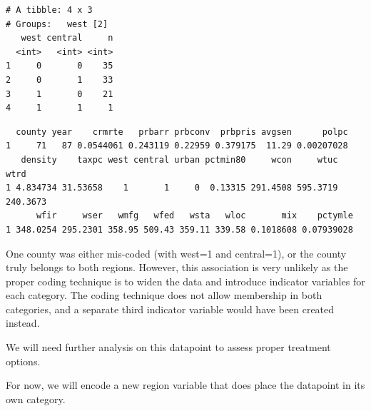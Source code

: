 \documentclass[]{article}
\newenvironment{Shaded}{}{}
\newcommand{\DecValTok}[1]{#1}
\newcommand{\KeywordTok}[1]{\textcolor[rgb]{0.00,0.00,1.00}{#1}}
\newcommand{\NormalTok}[1]{#1}
\newcommand{\OperatorTok}[1]{#1}
\newcommand{\StringTok}[1]{\textcolor[rgb]{0.00,0.50,0.50}{#1}}
\begin{document}
\begin{verbatim}
# A tibble: 4 x 3
# Groups:   west [2]
   west central     n
  <int>   <int> <int>
1     0       0    35
2     0       1    33
3     1       0    21
4     1       1     1
\end{verbatim}

\begin{Shaded}
\end{Shaded}

\begin{verbatim}
  county year    crmrte   prbarr prbconv  prbpris avgsen      polpc
1     71   87 0.0544061 0.243119 0.22959 0.379175  11.29 0.00207028
   density    taxpc west central urban pctmin80     wcon     wtuc     wtrd
1 4.834734 31.53658    1       1     0  0.13315 291.4508 595.3719 240.3673
      wfir     wser   wmfg   wfed   wsta   wloc       mix    pctymle
1 348.0254 295.2301 358.95 509.43 359.11 339.58 0.1018608 0.07939028
\end{verbatim}

One county was either mis-coded (with west=1 and central=1), or the
county truly belongs to both regions. However, this association is very
unlikely as the proper coding technique is to widen the data and
introduce indicator variables for each category. The coding technique
does not allow membership in both categories, and a separate third
indicator variable would have been created instead.

We will need further analysis on this datapoint to assess proper
treatment options.

For now, we will encode a new region variable that does place the
datapoint in its own category.
\end{document}
